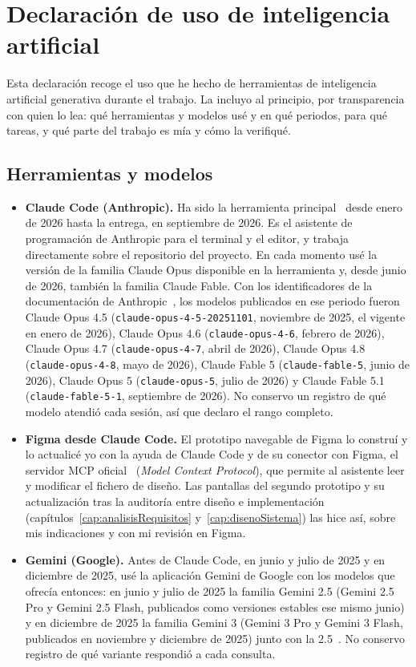 \chapter*{Declaración de uso de inteligencia artificial}

Esta declaración recoge el uso que he hecho de herramientas de inteligencia artificial generativa durante el trabajo. La incluyo al principio, por transparencia con quien lo lea: qué herramientas y modelos usé y en qué periodos, para qué tareas, y qué parte del trabajo es mía y cómo la verifiqué.

\section*{Herramientas y modelos}

\begin{itemize}
    \item \textbf{Claude Code (Anthropic).} Ha sido la herramienta principal~\citep{claudecode} desde enero de 2026 hasta la entrega, en septiembre de 2026. Es el asistente de programación de Anthropic para el terminal y el editor, y trabaja directamente sobre el repositorio del proyecto. En cada momento usé la versión de la familia Claude Opus disponible en la herramienta y, desde junio de 2026, también la familia Claude Fable. Con los identificadores de la documentación de Anthropic~\citep{anthropic2026models}, los modelos publicados en ese periodo fueron Claude Opus 4.5 (\texttt{claude-opus-4-5-20251101}, noviembre de 2025, el vigente en enero de 2026), Claude Opus 4.6 (\texttt{claude-opus-4-6}, febrero de 2026), Claude Opus 4.7 (\texttt{claude-opus-4-7}, abril de 2026), Claude Opus 4.8 (\texttt{claude-opus-4-8}, mayo de 2026), Claude Fable 5 (\texttt{claude-fable-5}, junio de 2026), Claude Opus 5 (\texttt{claude-opus-5}, julio de 2026) y Claude Fable 5.1 (\texttt{claude-fable-5-1}, septiembre de 2026). No conservo un registro de qué modelo atendió cada sesión, así que declaro el rango completo.
    \item \textbf{Figma desde Claude Code.} El prototipo navegable de Figma lo construí y lo actualicé yo con la ayuda de Claude Code y de su conector con Figma, el servidor MCP oficial~\citep{figmamcp} (\textit{Model Context Protocol}), que permite al asistente leer y modificar el fichero de diseño. Las pantallas del segundo prototipo y su actualización tras la auditoría entre diseño e implementación (capítulos~\ref{cap:analisisRequisitos} y~\ref{cap:disenoSistema}) las hice así, sobre mis indicaciones y con mi revisión en Figma.
    \item \textbf{Gemini (Google).} Antes de Claude Code, en junio y julio de 2025 y en diciembre de 2025, usé la aplicación Gemini de Google con los modelos que ofrecía entonces: en junio y julio de 2025 la familia Gemini 2.5 (Gemini 2.5 Pro y Gemini 2.5 Flash, publicados como versiones estables ese mismo junio) y en diciembre de 2025 la familia Gemini 3 (Gemini 3 Pro y Gemini 3 Flash, publicados en noviembre y diciembre de 2025) junto con la 2.5~\citep{google2026gemini}. No conservo registro de qué variante respondió a cada consulta.
\end{itemize}

